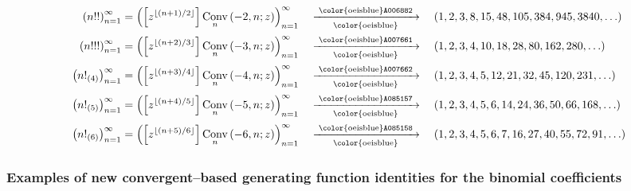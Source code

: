 \documentclass[12pt,reqno]{article}
\numberwithin{sfootnote}{section}
\numberwithin{equation}{section}
\theoremstyle{plain}
\theoremstyle{definition}
\theoremstyle{remark}
\newcommand{\OEISII}[1]{{\color{oeisblue}\texttt{#1}}}
\newcommand{\seqmapsto}[2][]{%
     \xrightarrow[\text{ \OEISII{#1} }]{\text{ \OEISII{#2} }}\quad%
}
\newcommand{\MultiFactorial}[2]{\ensuremath{#1!_{\left(#2\right)}}}
\newcommand{\ConvGF}[4]{\ensuremath{\Conv_{#1}\left(#2, #3; #4\right)}}
\DeclareMathOperator{\Conv}{Conv}
\begin{document}
\begin{align*} 
\left( n!! \right)_{n=1}^{\infty} & = \left( 
     \left[z^{\lfloor (n+1) / 2 \rfloor}\right] 
     \ConvGF{n}{-2}{n}{z} 
     \right)_{n=1}^{\infty} && 
     \seqmapsto{A006882} 
     \left(1, 2, 3, 8, 15, 48, 105, 384, 945, 3840, \ldots\right) \\ 
\left( n!!! \right)_{n=1}^{\infty} & = \left( 
     \left[z^{\lfloor (n+2) / 3 \rfloor}\right] 
     \ConvGF{n}{-3}{n}{z} 
     \right)_{n=1}^{\infty} && 
     \seqmapsto{A007661} 
     \left(1, 2, 3, 4, 10, 18, 28, 80, 162, 280, \ldots\right) \\ 
\left( \MultiFactorial{n}{4} \right)_{n=1}^{\infty} & = 
     \left( 
     \left[z^{\lfloor (n+3) / 4 \rfloor}\right] 
     \ConvGF{n}{-4}{n}{z} 
     \right)_{n=1}^{\infty} && 
     \seqmapsto{A007662} 
     \left(1, 2, 3, 4, 5, 12, 21, 32, 45, 120, 231, \ldots\right) \\ 
\left( \MultiFactorial{n}{5} \right)_{n=1}^{\infty} & = 
     \left( 
     \left[z^{\lfloor (n+4) / 5 \rfloor}\right] 
     \ConvGF{n}{-5}{n}{z} 
     \right)_{n=1}^{\infty} && 
     \seqmapsto{A085157} 
     \left(1, 2, 3, 4, 5, 6, 14, 24, 36, 50, 66, 168, \ldots\right) \\ 
\left( \MultiFactorial{n}{6} \right)_{n=1}^{\infty} & = 
     \left( 
     \left[z^{\lfloor (n+5) / 6 \rfloor}\right] 
     \ConvGF{n}{-6}{n}{z} 
     \right)_{n=1}^{\infty} && 
     \seqmapsto{A085158} 
     \left(1, 2, 3, 4, 5, 6, 7, 16, 27, 40, 55, 72, 91, \ldots\right) 
\end{align*} 

\subsubsection{Examples of new convergent--based generating function identities 
               for the binomial coefficients} 
\end{document}
